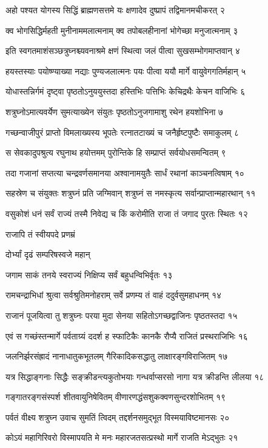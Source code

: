 अहो पश्यत योगस्य सिद्धिं ब्राह्मणसत्तमे
यः क्षणादेव दुष्प्रापं तद्विमानमचीकरत् २

क्व भोगसिद्धिर्महती मुनीनाममलात्मनाम्
क्व तपोबलहीनानां भोगेच्छा मनुजात्मनाम् ३

इति स्वगतमाशंसञ्छत्रुघ्नश्च्यवनाश्रमे
क्षणं स्थित्वा जलं पीत्वा सुखसम्भोगमाप्तवान् ४

हयस्तस्याः पयोष्ण्याख्या नद्याः पुण्यजलात्मनः
पयः पीत्वा ययौ मार्गे वायुवेगगतिर्महान् ५

योधास्तन्निर्गमं दृष्ट्वा पृष्ठतोऽनुययुस्तदा
हस्तिभिः पत्तिभिः केचिद्रथैः केचन वाजिभिः ६

शत्रुघ्नोऽमात्यवर्येण सुमत्याख्येन संयुतः
पृष्ठतोऽनुजगामाशु रथेन हयशोभिना ७

गच्छन्वाजीपुरं प्राप्तो विमलाख्यस्य भूपतेः
रत्नातटाख्यं च जनैर्हृष्टपुष्टैः समाकुलम् ८

स सेवकादुपश्रुत्य रघुनाथ हयोत्तमम्
पुरोन्तिके हि सम्प्राप्तं सर्वयोधसमन्वितम् ९

तदा गजानां सप्तत्या चन्द्रवर्णसमानया
अश्वानामयुतैः सार्धं रथानां काञ्चनत्विषाम् १०

सहस्रेण च संयुक्तः शत्रुघ्नं प्रति जग्मिवान्
शत्रुघ्नं स नमस्कृत्य सर्वान्प्राप्तान्महारथान् ११

वसुकोशं धनं सर्वं राज्यं तस्मै निवेद्य च
किं करोमीति राजा तं जगाद पुरतः स्थितः १२

राजापि तं स्वीयपदे प्रणम्रं

दोर्भ्यां दृढं सम्परिषस्वजे महान्

जगाम साकं तनये स्वराज्यं
निक्षिप्य सर्वं बहुधन्विभिर्वृतः १३

रामचन्द्राभिधां श्रुत्वा सर्वश्रुतिमनोहराम्
सर्वे प्रणम्य तं वाहं ददुर्वसुमहाधनम् १४

राजानं पूजयित्वा तु शत्रुघ्नः परया मुदा
सेनया सहितोऽगच्छद्वाजिनः पृष्ठतस्तदा १५

एवं स गच्छंस्तन्मार्गे पर्वताग्र्यं ददर्श ह
स्फाटिकैः कानकै रौप्यै राजितं प्रस्थराजिभिः १६

जलनिर्झरसंह्रादं नानाधातुकभूतलम्
गैरिकादिकसद्धातु लाक्षारङ्गविराजितम् १७

यत्र सिद्धाङ्गनाः सिद्धैः सङ्क्रीडन्त्यकुतोभयाः
गन्धर्वाप्सरसो नागा यत्र क्रीडन्ति लीलया १८

गङ्गातरङ्गसंस्पर्श शीतवायुनिषेवितम्
वीणारणद्धंसशुकक्वणसुन्दरशोभितम् १९

पर्वतं वीक्ष्य शत्रुघ्न उवाच सुमतिं त्विदम्
तद्दर्शनसमुद्भूत विस्मयाविष्टमानसः २०

कोऽयं महागिरिवरो विस्मापयति मे मनः
महारजतसत्प्रस्थो मार्गे राजति मेऽद्भुतः २१

